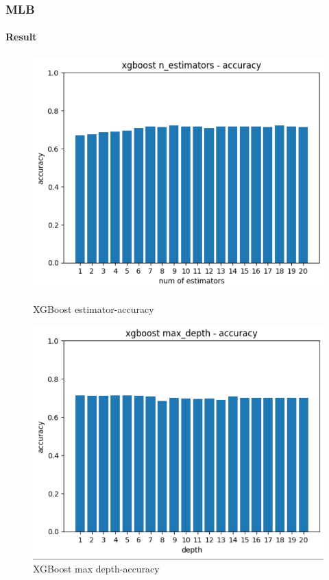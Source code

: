 \documentclass[
	11pt, %
	aspectratio=169, %
]{beamer}
\begin{document}
\begin{frame}
	\frametitle{MLB}
	\framesubtitle{Result}

	\begin{figure}[htbp]
		\begin{minipage}[t]{0.48\textwidth}
			\includegraphics[width=1.0\linewidth]{xgboost_estimator.png}
			\caption{XGBoost estimator-accuracy}
		\end{minipage}
		\begin{minipage}[t]{0.48\textwidth}
			\includegraphics[width=1.0\linewidth]{xgboost_depth.png}
			\caption{XGBoost max depth-accuracy}
		\end{minipage}
	\end{figure}
\end{frame}
\end{document}
